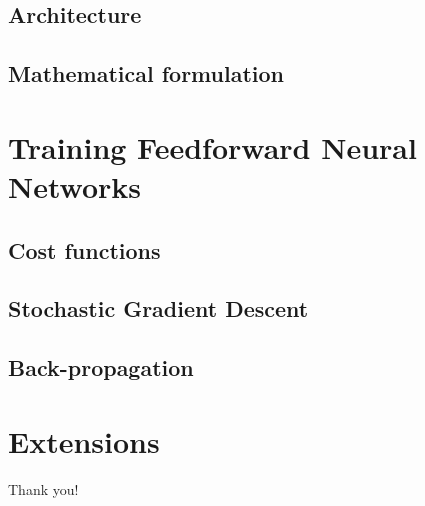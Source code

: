 \documentclass{beamer}
\begin{document}
	\subsection{Architecture}
	\subsection{Mathematical formulation}
	\section{Training Feedforward Neural Networks}
	\subsection{Cost functions}
	\subsection{Stochastic Gradient Descent}
	\subsection{Back-propagation}
	\section{Extensions}
	
	\begin{frame}[standout]
	Thank you!
	\end{frame}
	
\end{document}
